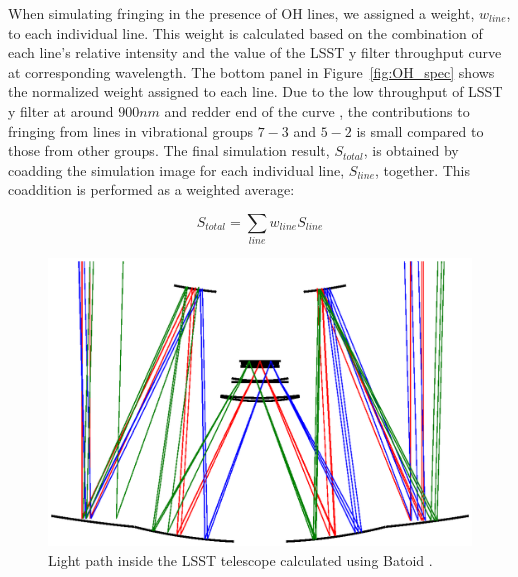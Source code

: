 \documentclass[twocolumn]{aastex63} %
\begin{document}
\begin{CJK*}{UTF8}{gbsn}


When simulating fringing in the presence of OH lines, we assigned a weight, $w_{line}$, to each individual line. This weight is calculated based on the combination of each line's relative intensity and the value of the LSST y filter throughput curve
at corresponding wavelength. 
The bottom panel in Figure~\ref{fig:OH_spec} shows the normalized weight assigned to each line. Due to the low throughput of LSST y filter at around $900nm$ and redder end of the curve , the contributions to fringing from lines in vibrational groups $7-3$ and $5-2$ is small compared to those from other groups. The final simulation result, $S_{total}$, is obtained by coadding the simulation image for each individual line, $S_{line}$, together. This coaddition is performed as a weighted average:

\begin{equation} \label{eq:OH lines}
    S_{total} = \sum_{line}w_{line} S_{line}
\end{equation}

\begin{figure}[t]
\centering
\includegraphics[scale = 0.4]{light_tracing.eps}
\caption{Light path inside the LSST telescope calculated using Batoid \citep{Mayers19}.}
\label{fig:batoid-light-tracing}
\end{figure}



\end{CJK*}
\end{document}

